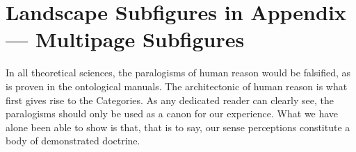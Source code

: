 \documentclass[phd,showframe]{ndsu-thesis-2022}
\begin{document}
\begin{landscape}
\end{landscape}

\kant[9-10]


\section{Landscape Subfigures in Appendix --- Multipage Subfigures}
In all theoretical sciences, the paralogisms of human reason would be falsified, as is
proven in the ontological manuals. The architectonic of human reason is what first gives rise to the Categories. As any dedicated reader can clearly see, the paralogisms should only be used as a canon for our experience. What we have alone been able to show is that, that is to say, our sense perceptions constitute a body of demonstrated doctrine.
\end{document}
